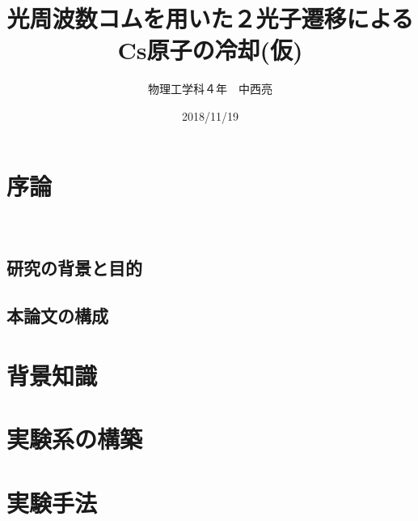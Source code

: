 \documentclass[uplatex,dvipdfmx,a4paper,report,papersize,11pt]{jsbook}
\title{光周波数コムを用いた２光子遷移によるCs原子の冷却(仮)}
\author{物理工学科４年　中西亮}
\date{2018/11/19}
\begin{document}
\maketitle
\newpage

\setcounter{tocdepth}{2}
\tableofcontents


\newpage
\chapter{序論}\\
\section{研究の背景と目的}

\section{本論文の構成}

\newpage
\chapter{背景知識}

\newpage
\chapter{実験系の構築}







\chapter{実験手法}
\end{document}

